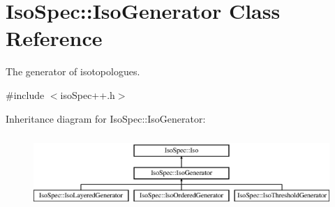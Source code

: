 \hypertarget{class_iso_spec_1_1_iso_generator}{}\section{Iso\+Spec\+:\+:Iso\+Generator Class Reference}
\label{class_iso_spec_1_1_iso_generator}


The generator of isotopologues.  




{\ttfamily \#include $<$iso\+Spec++.\+h$>$}

Inheritance diagram for Iso\+Spec\+:\+:Iso\+Generator\+:\begin{figure}[H]
\begin{center}
\leavevmode
\includegraphics[height=2.800000cm]{class_iso_spec_1_1_iso_generator}
\end{center}
\end{figure}
